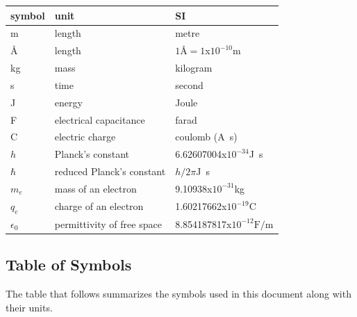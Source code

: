 \documentclass[12pt]{article}
\begin{document}
\renewcommand{\arraystretch}{1.2}
  \noindent \begin{tabular}{l l l} 
    \toprule		
    \textbf{symbol} & \textbf{unit} & \textbf{SI}\\
    \midrule 
    \si{\metre} & length & metre\\
    \si{\angstrom} & length & $1\si{\angstrom} = 1$x$10^{-10}$\si{\metre} \\
    \si{\kilogram} & mass	& kilogram\\
    \si{\second} & time & second\\
    \si{\joule} & energy & Joule\\
    \si{\farad} & electrical capacitance & farad \\
    \si{\coulomb} & electric charge & coulomb (\si{\ampere\second}) \\
    $h$ & Planck's constant & 6.62607004x$10^{-34}$\si{\joule\second} \\
    $\hbar$ & reduced Planck's constant & $h/2\pi$\si{\joule\second} \\
    $m_e$ & mass of an electron & 9.10938x$10^{-31}$\si{\kilogram} \\
    $q_e$ & charge of an electron & 1.60217662x$10^{-19}$\si{\coulomb} \\
    $\epsilon_0$ & permittivity of free space  & 8.854187817x$10^{−12} 
    \si{\farad/\metre}$ \\
    
    \bottomrule
  \end{tabular}


\subsection{Table of Symbols}

The table that follows summarizes the symbols used in this document along with
their units.
\end{document}
